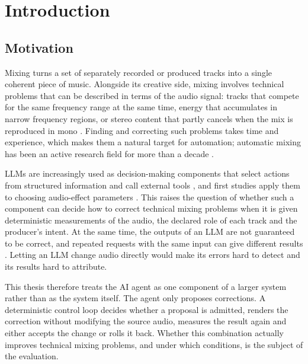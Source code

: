 \chapter{Introduction}
\label{ch:introduction}

\section{Motivation}
\label{sec:intro-motivation}

Mixing turns a set of separately recorded or produced tracks into a single coherent piece of music. Alongside its creative side, mixing involves technical problems that can be described in terms of the audio signal: tracks that compete for the same frequency range at the same time, energy that accumulates in narrow frequency regions, or stereo content that partly cancels when the mix is reproduced in mono . Finding and correcting such problems takes time and experience, which makes them a natural target for automation; automatic mixing has been an active research field for more than a decade \cite{DeMan2017TenYears}.

\Acp{LLM} are increasingly used as decision-making components that select actions from structured information and call external tools \cite{Wang2024AgentSurvey, Yao2023ReAct, Schick2023Toolformer}, and first studies apply them to choosing audio-effect parameters \cite{Doh2025LLM2Fx}. This raises the question of whether such a component can decide how to correct technical mixing problems when it is given deterministic measurements of the audio, the declared role of each track and the producer's intent. At the same time, the outputs of an \ac{LLM} are not guaranteed to be correct, and repeated requests with the same input can give different results \cite{Ouyang2023Nondeterminism}. Letting an \ac{LLM} change audio directly would make its errors hard to detect and its results hard to attribute.

This thesis therefore treats the \ac{AI} agent as one component of a larger system rather than as the system itself. The agent only proposes corrections. A deterministic control loop decides whether a proposal is admitted, renders the correction without modifying the source audio, measures the result again and either accepts the change or rolls it back. Whether this combination actually improves technical mixing problems, and under which conditions, is the subject of the evaluation.

